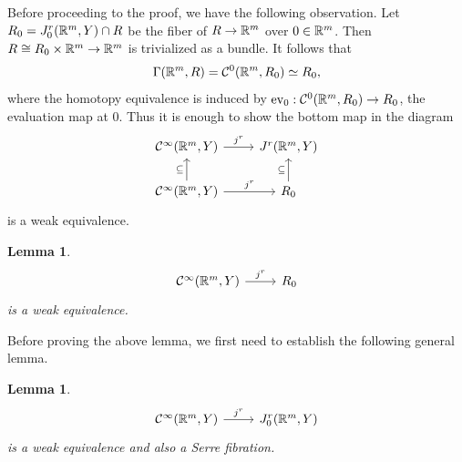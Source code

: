 \documentclass{article}
\newtheorem{lemma}[theorem]{Lemma}
\newtheorem{proposed work}[theorem]{Proposed Work}
\begin{document}
Before proceeding to the proof, we have the following observation. Let
$R_0 = J_0^r(\mathbb R^m,Y) \cap R$ be the fiber of $R \to \mathbb R^m$ over
$0 \in \mathbb R^m$. Then $R \cong R_0 \times \mathbb R^m \to \mathbb R^m$ is trivialized
as a bundle. It follows that
\begin{equation*}
\Gamma(\mathbb R^m,R) = \mathcal C^0(\mathbb R^m, R_0) \simeq R_0,
\end{equation*}
where the homotopy equivalence is induced by
$\mathrm{ev}_0: \mathcal C^0(\mathbb R^m, R_0) \to R_0$, the evaluation map at
$0$. Thus it is enough to show the bottom map in the diagram
\begin{equation*}
\begin{tikzcd}
\cC^\infty(\R^m,Y) \ar[r,"j^r"] & J^r(\R^m,Y) \\
\cC^\infty(\R^m,Y) \ar[u, "\subseteq"] \ar[r, "j^r"] & R_0 \ar[u, "\subseteq"]
\end{tikzcd}
\end{equation*}
is a weak equivalence.

\begin{lemma}
\label{hlocallemma1}
\begin{equation*}
\begin{tikzcd}
\cC^\infty(\R^m,Y)\ar[r, "j^r"] & R_0
\end{tikzcd}
\end{equation*}
is a weak equivalence.
\end{lemma}

Before proving the above lemma, we first need to establish the
following general lemma.

\begin{lemma}
\label{hlocallemma2}
\begin{equation*}
\begin{tikzcd}
\cC^\infty(\R^m,Y) \ar[r,"j^r"] & J_0^r(\R^m,Y)
\end{tikzcd}
\end{equation*}
is a weak equivalence and also a Serre fibration.
\end{lemma}
\end{document}
